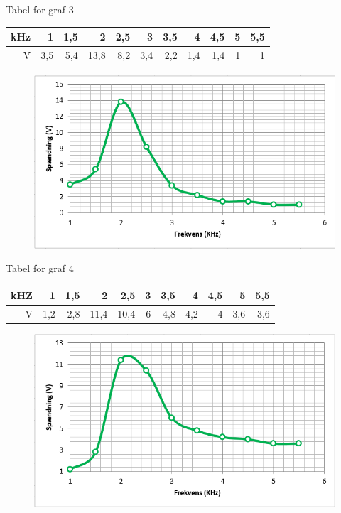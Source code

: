 Tabel for graf 3

\begin{tabular}{|r|r|r|r|r|r|r|r|r|r|r|} \hline
kHz & 1 & 1,5 & 2 & 2,5 & 3 & 3,5 & 4 & 4,5 & 5 & 5,5 \\ \hline
V & 3,5 & 5,4 & 13,8 & 8,2 & 3,4 & 2,2 & 1,4 & 1,4 & 1 & 1 \\ \hline
\end{tabular}

\begin{figure}[H]
\includegraphics[scale=1]{Graf3}
\end{figure}

Tabel for graf 4

\begin{tabular}{|r|r|r|r|r|r|r|r|r|r|r|} \hline
kHZ & 1 & 1,5 & 2 & 2,5 & 3 & 3,5 & 4 & 4,5 & 5 & 5,5 \\ \hline
V & 1,2 & 2,8 & 11,4 & 10,4 & 6 & 4,8 & 4,2 & 4 & 3,6 & 3,6 \\ \hline
\end{tabular}

\begin{figure}[H]
\includegraphics[scale=1]{Graf4}
\end{figure}

